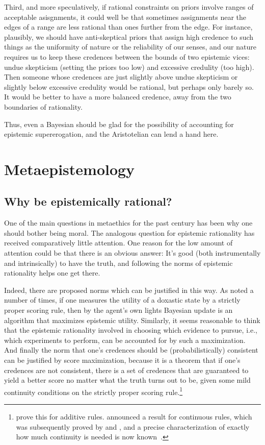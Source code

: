 Third, and more speculatively, if rational constraints on priors involve ranges of acceptable asisgnments, it could well be that 
sometimes assignments near the edges of a range are less rational than ones further from the edge. For instance, plausibly, we 
should have anti-skeptical priors that assign high credence to such things as the uniformity of nature or the reliability of 
our senses, and our nature requires us to keep these credences between the bounds of two epistemic vices: undue skepticism (setting 
the priors too low) and excessive credulity (too high). Then someone whose credences are just slightly above undue skepticism 
or slightly below excessive credulity would be rational, but perhaps only barely so. It would be better to have a more balanced
credence, away from the two boundaries of rationality.

Thus, even a Bayesian should be glad for the possibility of accounting for epistemic supererogation, and
the Aristotelian can lend a hand here.

\section{Metaepistemology}
\subsection{Why be epistemically rational?}
One of the main questions in metaethics for the past century has been why one should bother being moral. The analogous
question for epistemic rationality has received comparatively little attention.
One reason for the low amount of attention could be that there is an obvious answer: It's good 
(both instrumentally and intrinsically) to have the truth, and following the norms of epistemic rationality 
helps one get there.

Indeed, there are proposed norms which can be justified in this way. As noted a number of times, if one measures the utility of a 
doxastic state by a strictly proper scoring rule, then by the agent's own lights Bayesian update is 
an algorithm that maximizes epistemic utility. Similarly, it seems reasonable to think that the
epistemic rationality involved in choosing which evidence to pursue, i.e., which experiments to perform, 
can be accounted for by such a maximization. And finally the norm that one's credences should be 
(probabilistically) consistent can be justified by score maximization, because it is a theorem
that if one's credences are not consistent, there is a set of credences that are guaranteed to yield 
a better score no matter what the truth turns out to be, given some mild continuity conditions on the
strictly proper scoring rule.\footnote{ prove this for additive rules. 
announced a result for continuous rules, which was subsequently proved by  and
, and a precise  characterization of exactly how much continuity is needed is now
known~\parencite{PrussCont}.}

